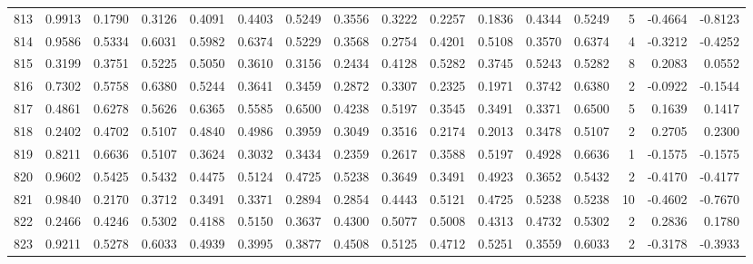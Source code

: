 \begin{tabular}{lrrrrrrrrrrrrrrr}
813 &      0.9913 &  0.1790 &  0.3126 &  0.4091 &  0.4403 &  0.5249 &  0.3556 &  0.3222 &  0.2257 &  0.1836 &   0.4344 &     0.5249 &      5 &                   -0.4664 &                    -0.8123 \\
814 &      0.9586 &  0.5334 &  0.6031 &  0.5982 &  0.6374 &  0.5229 &  0.3568 &  0.2754 &  0.4201 &  0.5108 &   0.3570 &     0.6374 &      4 &                   -0.3212 &                    -0.4252 \\
815 &      0.3199 &  0.3751 &  0.5225 &  0.5050 &  0.3610 &  0.3156 &  0.2434 &  0.4128 &  0.5282 &  0.3745 &   0.5243 &     0.5282 &      8 &                    0.2083 &                     0.0552 \\
816 &      0.7302 &  0.5758 &  0.6380 &  0.5244 &  0.3641 &  0.3459 &  0.2872 &  0.3307 &  0.2325 &  0.1971 &   0.3742 &     0.6380 &      2 &                   -0.0922 &                    -0.1544 \\
817 &      0.4861 &  0.6278 &  0.5626 &  0.6365 &  0.5585 &  0.6500 &  0.4238 &  0.5197 &  0.3545 &  0.3491 &   0.3371 &     0.6500 &      5 &                    0.1639 &                     0.1417 \\
818 &      0.2402 &  0.4702 &  0.5107 &  0.4840 &  0.4986 &  0.3959 &  0.3049 &  0.3516 &  0.2174 &  0.2013 &   0.3478 &     0.5107 &      2 &                    0.2705 &                     0.2300 \\
819 &      0.8211 &  0.6636 &  0.5107 &  0.3624 &  0.3032 &  0.3434 &  0.2359 &  0.2617 &  0.3588 &  0.5197 &   0.4928 &     0.6636 &      1 &                   -0.1575 &                    -0.1575 \\
820 &      0.9602 &  0.5425 &  0.5432 &  0.4475 &  0.5124 &  0.4725 &  0.5238 &  0.3649 &  0.3491 &  0.4923 &   0.3652 &     0.5432 &      2 &                   -0.4170 &                    -0.4177 \\
821 &      0.9840 &  0.2170 &  0.3712 &  0.3491 &  0.3371 &  0.2894 &  0.2854 &  0.4443 &  0.5121 &  0.4725 &   0.5238 &     0.5238 &     10 &                   -0.4602 &                    -0.7670 \\
822 &      0.2466 &  0.4246 &  0.5302 &  0.4188 &  0.5150 &  0.3637 &  0.4300 &  0.5077 &  0.5008 &  0.4313 &   0.4732 &     0.5302 &      2 &                    0.2836 &                     0.1780 \\
823 &      0.9211 &  0.5278 &  0.6033 &  0.4939 &  0.3995 &  0.3877 &  0.4508 &  0.5125 &  0.4712 &  0.5251 &   0.3559 &     0.6033 &      2 &                   -0.3178 &                    -0.3933 \\

\end{tabular}
